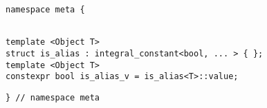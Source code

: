 
\begin{verbatim}
namespace meta {
\end{verbatim}
\begin{verbatim}

template <Object T>
struct is_alias : integral_constant<bool, ... > { };
template <Object T>
constexpr bool is_alias_v = is_alias<T>::value;

\end{verbatim}
\begin{verbatim}
} // namespace meta
\end{verbatim}
